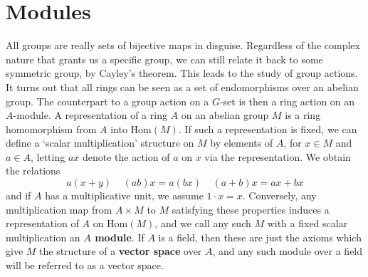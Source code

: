 








\chapter{Modules}

All groups are really sets of bijective maps in disguise. Regardless of the complex nature that grants us a specific group, we can still relate it back to some symmetric group, by Cayley's theorem. This leads to the study of group actions. It turns out that all rings can be seen as a set of endomorphisms over an abelian group. The counterpart to a group action on a $G$-set is then a ring action on an $A$-module. A representation of a ring $A$ on an abelian group $M$ is a ring homomorphism from $A$ into $\text{Hom}(M)$. If such a representation is fixed, we can define a `scalar multiplication' structure on $M$ by elements of $A$, for $x \in M$ and $a \in A$, letting $ax$ denote the action of $a$ on $x$ via the representation. We obtain the relations
%
\[ a(x + y)\ \ \ \ \ (ab) x = a(bx)\ \ \ \ \ (a + b)x = ax + bx \]
%
and if $A$ has a multiplicative unit, we assume $1 \cdot x = x$. Conversely, any multiplication map from $A \times M$ to $M$ satisfying these properties induces a representation of $A$ on $\text{Hom}(M)$, and we call any such $M$ with a fixed scalar multiplication an {\bf $A$ module}. If $A$ is a field, then these are just the axioms which give $M$ the structure of a {\bf vector space} over $A$, and any such module over a field will be referred to as a vector space.

